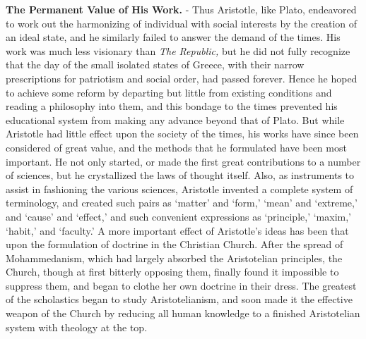 \documentclass[
]{book}
\begin{document}
\textbf{The Permanent Value of His Work.} - Thus Aristotle, like Plato, endeavored to work out the harmonizing of individual with social interests by the creation of an ideal state, and he similarly failed to answer the demand of the times. His work was much less visionary than \emph{The Republic,} but he did not fully recognize that the day of the small isolated states of Greece, with their narrow prescriptions for patriotism and social order, had passed forever. Hence he hoped to achieve some reform by departing but little from existing conditions and reading a philosophy into them, and this bondage to the times prevented his educational system from making any advance beyond that of Plato. But while Aristotle had little effect upon the society of the times, his works have since been considered of great value, and the methods that he formulated have been most important. He not only started, or made the first great contributions to a number of sciences, but he crystallized the laws of thought itself. Also, as instruments to assist in fashioning the various sciences, Aristotle invented a complete system of terminology, and created such pairs as `matter' and `form,' `mean' and `extreme,' and `cause' and `effect,' and such convenient expressions as `principle,' `maxim,' `habit,' and `faculty.' A more important effect of Aristotle's ideas has been that upon the formulation of doctrine in the Christian Church. After the spread of Mohammedanism, which had largely absorbed the Aristotelian principles, the Church, though at first bitterly opposing them, finally found it impossible to suppress them, and began to clothe her own doctrine in their dress. The greatest of the scholastics began to study Aristotelianism, and soon made it the effective weapon of the Church by reducing all human knowledge to a finished Aristotelian system with theology at the top.
\end{document}
